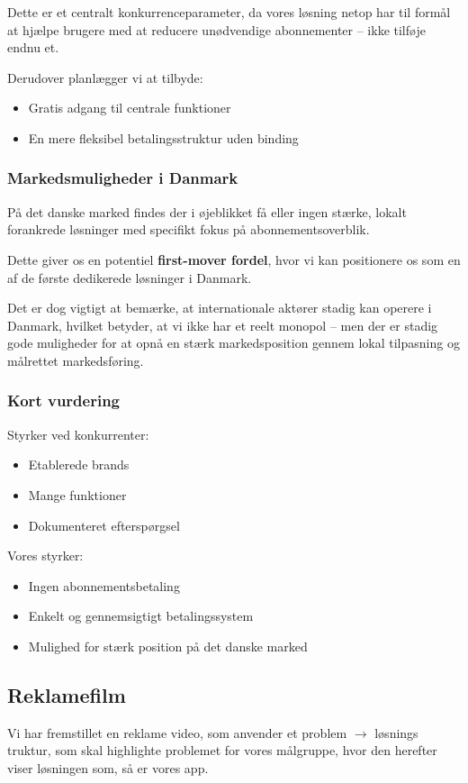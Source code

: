 Dette er et centralt konkurrenceparameter, da vores løsning netop har til formål at hjælpe brugere med at reducere unødvendige abonnementer – ikke tilføje endnu et. 

Derudover planlægger vi at tilbyde: 
\begin{itemize}
\item Gratis adgang til centrale funktioner  
\item En mere fleksibel betalingsstruktur uden binding  
\end{itemize}

\subsubsection{Markedsmuligheder i Danmark}
På det danske marked findes der i øjeblikket få eller ingen stærke, lokalt forankrede løsninger med specifikt fokus på abonnementsoverblik. 

Dette giver os en potentiel \textbf{first-mover fordel}, hvor vi kan positionere os som en af de første dedikerede løsninger i Danmark. 

Det er dog vigtigt at bemærke, at internationale aktører stadig kan operere i Danmark, hvilket betyder, at vi ikke har et reelt monopol – men der er stadig gode muligheder for at opnå en stærk markedsposition gennem lokal tilpasning og målrettet markedsføring. 

\subsubsection{Kort vurdering}
Styrker ved konkurrenter:
\begin{itemize}
\item Etablerede brands  
\item Mange funktioner  
\item Dokumenteret efterspørgsel  
\end{itemize}

Vores styrker: 
\begin{itemize}
\item Ingen abonnementsbetaling  
\item Enkelt og gennemsigtigt betalingssystem  
\item Mulighed for stærk position på det danske marked 
\end{itemize}
 
\subsection{Reklamefilm}
Vi har fremstillet en reklame video, som anvender et problem $\rightarrow$ løsnings truktur, som skal highlighte problemet for vores målgruppe, hvor den herefter viser løsningen som, så er vores app.\\

